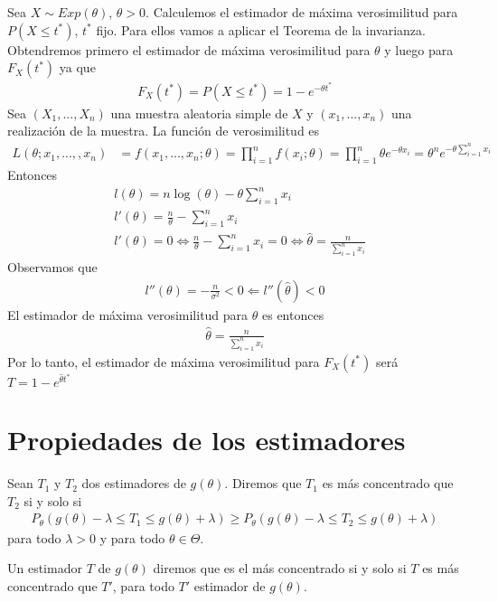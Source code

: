 \begin{ejemplo}
    Sea $X \sim Exp(\theta)$, $\theta > 0$. Calculemos el estimador de máxima verosimilitud para $P(X \leq t^*)$, $t^*$ fijo. Para ellos vamos a aplicar el Teorema de la invarianza. Obtendremos primero el estimador de máxima verosimilitud para $\theta$ y luego para $F_X(t^*)$ ya que
    \begin{align*}
        F_X(t^*) = P(X \leq t^*) = 1 - e^{-\theta t^*}
    \end{align*}
    Sea $(X_1,...,X_n)$ una muestra aleatoria simple de $X$ y $(x_1,...,x_n)$ una realización de la muestra. La función de verosimilitud es
    \begin{align*}
        L(\theta;x_1,...,,x_n) & = f(x_1,...,x_n;\theta) = \prod_{i=1}^{n}{f(x_i;\theta)} = \prod_{i=1}^{n}{\theta e^{-\theta x_i}}
        = \theta^n e^{-\theta \sum_{i=1}^{n}{x_i}}
    \end{align*}
    Entonces
    \begin{align*}
         & l(\theta) = n\log(\theta) - \theta \sum_{i=1}^{n}{x_i}                                                                                         \\
         & l'(\theta) = \frac{n}{\theta} - \sum_{i=1}^{n}{x_i}                                                                                            \\
         & l'(\theta) = 0 \Longleftrightarrow \frac{n}{\theta} - \sum_{i=1}^{n}{x_i} = 0 \Longleftrightarrow \hat{\theta} = \frac{n}{\sum_{i=1}^{n}{x_i}}
    \end{align*}
    Observamos que
    \begin{align*}
        l''(\theta) = - \frac{n}{\sigma^2} < 0 \Longleftarrow l''(\hat{\theta}) < 0
    \end{align*}
    El estimador de máxima verosimilitud para $\theta$ es entonces
    \begin{align*}
        \hat{\theta} = \frac{n}{\sum_{i=1}^{n}{x_i}}
    \end{align*}
    Por lo tanto, el estimador de máxima verosimilitud para $F_X(t^*)$ será $T = 1 - e^{\hat{\theta} t^*}$
\end{ejemplo}

\section{Propiedades de los estimadores}

\begin{defi}
    Sean $T_1$ y $T_2$ dos estimadores de $g(\theta)$. Diremos que $T_1$ es más concentrado que $T_2$ si y solo si
    \begin{align*}
        P_{\theta}\left( g(\theta) - \lambda \leq T_1 \leq g(\theta) + \lambda \right) \ge P_{\theta}\left( g(\theta) - \lambda \leq T_2 \leq g(\theta) + \lambda \right)
    \end{align*}
    para todo $\lambda > 0$ y para todo $\theta \in \Theta$.

    Un estimador $T$ de $g(\theta)$ diremos que es el más concentrado si y solo si $T$ es más concentrado que $T'$, para todo $T'$ estimador de $g(\theta)$.
\end{defi}

